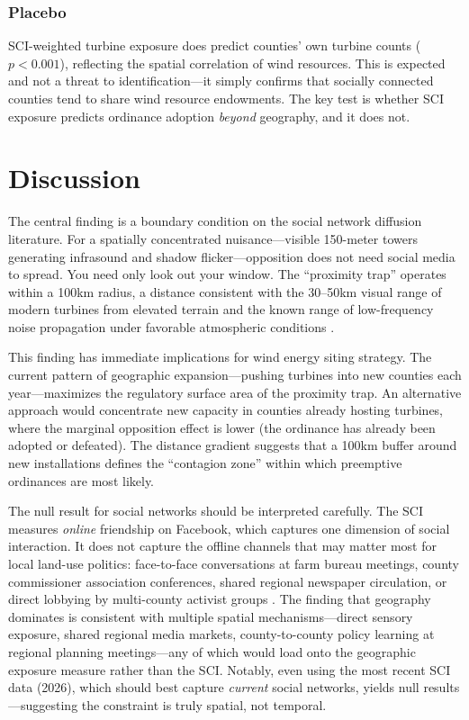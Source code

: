 \documentclass[12pt]{article}
\begin{document}
\subsubsection*{Placebo} SCI-weighted turbine exposure does predict counties' own turbine counts ($p < 0.001$), reflecting the spatial correlation of wind resources. This is expected and not a threat to identification---it simply confirms that socially connected counties tend to share wind resource endowments. The key test is whether SCI exposure predicts ordinance adoption \textit{beyond} geography, and it does not.

\section{Discussion}

The central finding is a boundary condition on the social network diffusion literature. For a spatially concentrated nuisance---visible 150-meter towers generating infrasound and shadow flicker---opposition does not need social media to spread. You need only look out your window. The ``proximity trap'' operates within a 100km radius, a distance consistent with the 30--50km visual range of modern turbines from elevated terrain and the known range of low-frequency noise propagation under favorable atmospheric conditions \citep{pedersen2009}.

This finding has immediate implications for wind energy siting strategy. The current pattern of geographic expansion---pushing turbines into new counties each year---maximizes the regulatory surface area of the proximity trap. An alternative approach would concentrate new capacity in counties already hosting turbines, where the marginal opposition effect is lower (the ordinance has already been adopted or defeated). The distance gradient suggests that a 100km buffer around new installations defines the ``contagion zone'' within which preemptive ordinances are most likely.

The null result for social networks should be interpreted carefully. The SCI measures \textit{online} friendship on Facebook, which captures one dimension of social interaction. It does not capture the offline channels that may matter most for local land-use politics: face-to-face conversations at farm bureau meetings, county commissioner association conferences, shared regional newspaper circulation, or direct lobbying by multi-county activist groups \citep{jaroszewicz2022}. The finding that geography dominates is consistent with multiple spatial mechanisms---direct sensory exposure, shared regional media markets, county-to-county policy learning at regional planning meetings---any of which would load onto the geographic exposure measure rather than the SCI. Notably, even using the most recent SCI data (2026), which should best capture \textit{current} social networks, yields null results---suggesting the constraint is truly spatial, not temporal.
\end{document}
